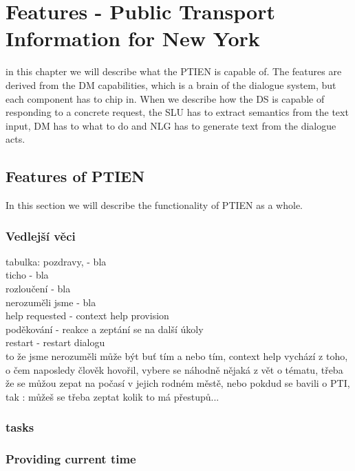 \chapter{Features - Public Transport Information for New York}

in this chapter we will describe what the PTIEN is capable of. The features are derived from the DM capabilities, which is a brain of the dialogue system, but each component has to chip in. When we describe how the DS is capable of responding to a concrete request, the SLU has to extract semantics from the text input, DM has to what to do and NLG has to generate text from the dialogue acts.


\section{Features of PTIEN}

In this section we will describe the functionality of PTIEN as a whole.

\subsection{Vedlejší věci}

tabulka:
pozdravy, - bla \\
ticho - bla \\
rozloučení - bla \\
nerozuměli jsme - bla \\
help requested - context help provision \\
poděkování - reakce a zeptání se na další úkoly \\
restart - restart dialogu \\

to že jsme nerozuměli může být buť tím a nebo tím,
context help vychází z toho, o čem naposledy člověk hovořil, vybere se náhodně nějaká z vět o tématu, třeba že se můžou zepat na počasí v jejich rodném městě, nebo pokdud se bavili o PTI, tak : můžeš se třeba zeptat kolik to má přestupů...




\subsection{tasks}

\subsection{Providing current time} \label{subsec:time}

